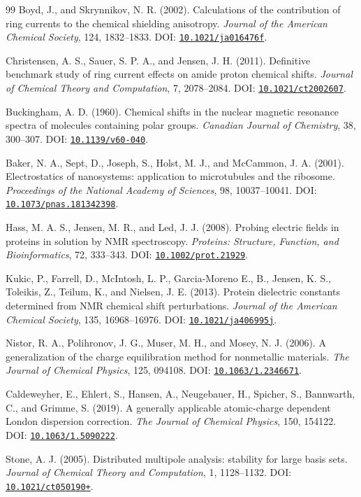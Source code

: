 \documentclass[11pt]{article}
\newcommand{\doi}[1]{\href{https://doi.org/#1}{\nolinkurl{#1}}}
\begin{document}
\begin{thebibliography}{99}
Boyd, J., and Skrynnikov, N. R. (2002).
Calculations of the contribution of ring currents to the chemical shielding
anisotropy.
\emph{Journal of the American Chemical Society}, 124, 1832--1833.
DOI: \doi{10.1021/ja016476f}.

Christensen, A. S., Sauer, S. P. A., and Jensen, J. H. (2011).
Definitive benchmark study of ring current effects on amide proton chemical
shifts.
\emph{Journal of Chemical Theory and Computation}, 7, 2078--2084.
DOI: \doi{10.1021/ct2002607}.

Buckingham, A. D. (1960).
Chemical shifts in the nuclear magnetic resonance spectra of molecules
containing polar groups.
\emph{Canadian Journal of Chemistry}, 38, 300--307.
DOI: \doi{10.1139/v60-040}.

Baker, N. A., Sept, D., Joseph, S., Holst, M. J., and McCammon, J. A. (2001).
Electrostatics of nanosystems: application to microtubules and the ribosome.
\emph{Proceedings of the National Academy of Sciences}, 98, 10037--10041.
DOI: \doi{10.1073/pnas.181342398}.

Hass, M. A. S., Jensen, M. R., and Led, J. J. (2008).
Probing electric fields in proteins in solution by NMR spectroscopy.
\emph{Proteins: Structure, Function, and Bioinformatics}, 72, 333--343.
DOI: \doi{10.1002/prot.21929}.

Kukic, P., Farrell, D., McIntosh, L. P., Garcia-Moreno E., B.,
Jensen, K. S., Toleikis, Z., Teilum, K., and Nielsen, J. E. (2013).
Protein dielectric constants determined from NMR chemical shift perturbations.
\emph{Journal of the American Chemical Society}, 135, 16968--16976.
DOI: \doi{10.1021/ja406995j}.

Nistor, R. A., Polihronov, J. G., Muser, M. H., and Mosey, N. J. (2006).
A generalization of the charge equilibration method for nonmetallic materials.
\emph{The Journal of Chemical Physics}, 125, 094108.
DOI: \doi{10.1063/1.2346671}.

Caldeweyher, E., Ehlert, S., Hansen, A., Neugebauer, H., Spicher, S.,
Bannwarth, C., and Grimme, S. (2019).
A generally applicable atomic-charge dependent London dispersion correction.
\emph{The Journal of Chemical Physics}, 150, 154122.
DOI: \doi{10.1063/1.5090222}.

Stone, A. J. (2005).
Distributed multipole analysis: stability for large basis sets.
\emph{Journal of Chemical Theory and Computation}, 1, 1128--1132.
DOI: \doi{10.1021/ct050190+}.


\end{thebibliography}
\end{document}
